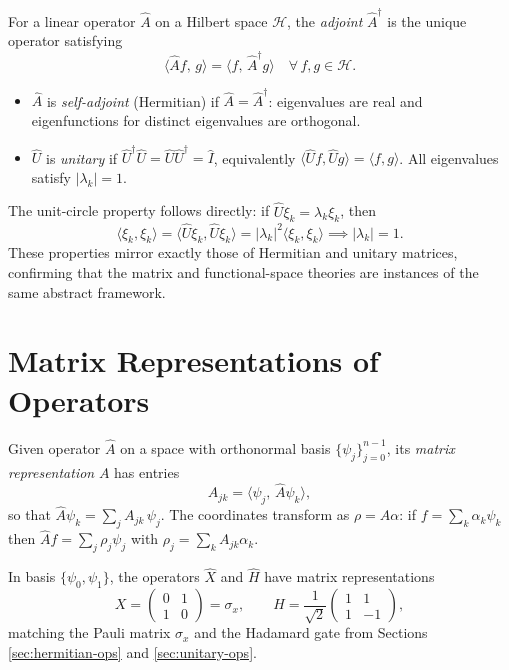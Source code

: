 For a linear operator $\hat{A}$ on a Hilbert space $\mathcal{H}$, the \emph{adjoint} $\hat{A}^\dagger$ is the unique operator satisfying
\[
  \langle\hat{A}f,\,g\rangle = \langle f,\,\hat{A}^\dagger g\rangle \quad \forall\,f,g\in\mathcal{H}.
\]
\begin{itemize}
  \item $\hat{A}$ is \emph{self-adjoint} (Hermitian) if $\hat{A}=\hat{A}^\dagger$: eigenvalues are real and eigenfunctions for distinct eigenvalues are orthogonal.
  \item $\hat{U}$ is \emph{unitary} if $\hat{U}^\dagger\hat{U}=\hat{U}\hat{U}^\dagger=\hat{I}$, equivalently $\langle\hat{U}f,\hat{U}g\rangle=\langle f,g\rangle$. All eigenvalues satisfy $|\lambda_k|=1$.
\end{itemize}

The unit-circle property follows directly: if $\hat{U}\xi_k=\lambda_k\xi_k$, then
\[
  \langle\xi_k,\xi_k\rangle = \langle\hat{U}\xi_k,\hat{U}\xi_k\rangle = |\lambda_k|^2\langle\xi_k,\xi_k\rangle
  \implies |\lambda_k|=1.
\]
These properties mirror exactly those of Hermitian and unitary matrices, confirming that the matrix and functional-space theories are instances of the same abstract framework.

\section{Matrix Representations of Operators}
\label{sec:matrix-rep}

Given operator $\hat{A}$ on a space with orthonormal basis $\{\psi_j\}_{j=0}^{n-1}$, its \emph{matrix representation} $A$ has entries
\[
  A_{jk} = \langle\psi_j,\,\hat{A}\psi_k\rangle,
\]
so that $\hat{A}\psi_k=\sum_j A_{jk}\,\psi_j$. The coordinates transform as $\rho=A\alpha$: if $f=\sum_k\alpha_k\psi_k$ then $\hat{A}f=\sum_j\rho_j\psi_j$ with $\rho_j=\sum_k A_{jk}\alpha_k$.

\begin{example}
In basis $\{\psi_0,\psi_1\}$, the operators $\hat{X}$ and $\hat{H}$ have matrix representations
\[
  X = \begin{pmatrix}0&1\\1&0\end{pmatrix} = \sigma_x,\qquad
  H = \frac{1}{\sqrt{2}}\begin{pmatrix}1&1\\1&-1\end{pmatrix},
\]
matching the Pauli matrix $\sigma_x$ and the Hadamard gate from Sections \ref{sec:hermitian-ops} and \ref{sec:unitary-ops}.
\end{example}

